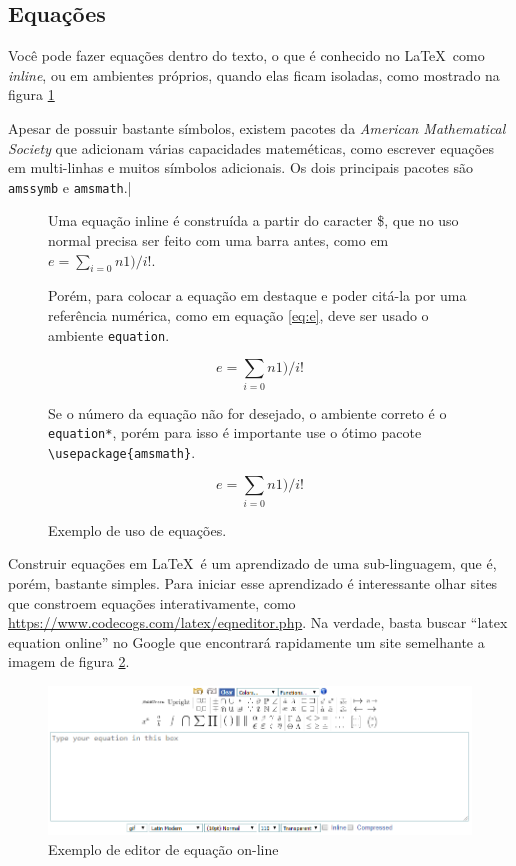 \subsection{Equações}

Você pode fazer equações dentro do texto, o que é conhecido no \LaTeX\ como \textit{inline}, ou em ambientes próprios, quando elas ficam isoladas, como mostrado na figura \ref{fig:eq}

Apesar de possuir bastante símbolos, existem pacotes da \textit{American Mathematical Society} que adicionam várias capacidades mateméticas, como escrever equações em multi-linhas e muitos símbolos adicionais. Os dois principais pacotes são \lstinline|amssymb| e \lstinline|amsmath|.|

\begin{figure}
    \begin{LTXexample}[pos=b]
Uma equação inline é construída a partir do caracter
\$, que no uso normal precisa ser feito com uma barra
antes, como em $e=\sum_{i=0}{n}1)/i!$.

Porém, para colocar a equação em destaque e poder citá-la
por uma referência numérica, como em equação \ref{eq:e},
deve ser usado o ambiente
 \lstinline|equation|.

\begin{equation}\label{eq:e}
e=\sum_{i=0}{n}1)/i!
\end{equation}

Se o número da equação não for desejado, o ambiente
correto é o \lstinline|equation*|, porém para isso é
 importante use o ótimo pacote
  \lstinline|\usepackage{amsmath}|.


\begin{equation*}
e=\sum_{i=0}{n}1)/i!
\end{equation*}

    \end{LTXexample}
    \caption{Exemplo de uso de equações.}
    \label{fig:eq}
\end{figure}

Construir equações em \LaTeX\ é um aprendizado de uma sub-linguagem, que é, porém, bastante simples. Para iniciar esse aprendizado é interessante olhar sites que constroem equações interativamente, como \url{https://www.codecogs.com/latex/eqneditor.php}. Na verdade, basta buscar ``latex equation online'' no Google que encontrará rapidamente um site semelhante a imagem de figura \ref{fig:editor:eq}.

    \begin{figure}[hbt]
    \centering
    \includegraphics[width=.8\linewidth]{Images/equationeditor.png}
    \caption{Exemplo de editor de equação on-line}
    \label{fig:editor:eq}
\end{figure}

